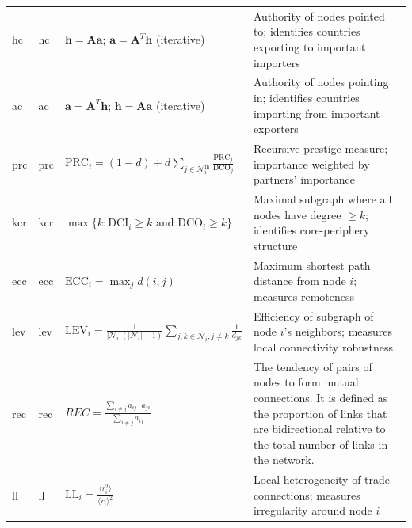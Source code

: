 \documentclass[preprint, 3p,
authoryear]{elsarticle} %
\begin{document}
\begin{longtable}{p{1.2cm}p{3.5cm}p{5cm}p{5.5cm}}
\acrshort{hc} & \acrlong{hc} & $\mathbf{h} = \mathbf{A} \mathbf{a}$; $\mathbf{a} = \mathbf{A}^T \mathbf{h}$ (iterative) & Authority of nodes pointed to; identifies countries exporting to important importers \\
\addlinespace

\acrshort{ac} & \acrlong{ac} & $\mathbf{a} = \mathbf{A}^T \mathbf{h}$; $\mathbf{h} = \mathbf{A} \mathbf{a}$ (iterative) & Authority of nodes pointing in; identifies countries importing from important exporters \\
\addlinespace

\acrshort{prc} & \acrlong{prc} & $\text{PRC}_i = (1-d) + d \sum_{j \in \mathcal{N}_i^{\text{in}}} \frac{\text{PRC}_j}{\text{DCO}_j}$ & Recursive prestige measure; importance weighted by partners' importance \\
\addlinespace

\acrshort{kcr} & \acrlong{kcr} & $\max\{k : \text{DCI}_i \geq k \text{ and } \text{DCO}_i \geq k\}$ & Maximal subgraph where all nodes have degree $\geq k$; identifies core-periphery structure \\
\addlinespace

\acrshort{ecc} & \acrlong{ecc} & $\text{ECC}_i = \max_{j} d(i,j)$ & Maximum shortest path distance from node $i$; measures remoteness \\
\addlinespace

\acrshort{lev} & \acrlong{lev} & $\text{LEV}_i = \frac{1}{|\mathcal{N}_i|(|\mathcal{N}_i|-1)} \sum_{j,k \in \mathcal{N}_i, j \neq k} \frac{1}{d_{jk}}$ & Efficiency of subgraph of node $i$'s neighbors; measures local connectivity robustness \\
\addlinespace

\acrshort{rec} & \acrlong{rec} & $REC=\frac{\sum_{i\neq j}a_{ij}\cdot a_{ji}}{\sum_{i\neq j} a_{ij}}$ &  The tendency of pairs of nodes to form mutual connections. It is defined as the proportion of links that are bidirectional relative to the total number of links in the network. \\
\addlinespace

\acrshort{ll} & \acrlong{ll} & $\text{LL}_i = \frac{\langle r_i^2 \rangle}{\langle r_i \rangle^2}$ & Local heterogeneity of trade connections; measures irregularity around node $i$ \\

\bottomrule
\end{longtable}
\end{document}
